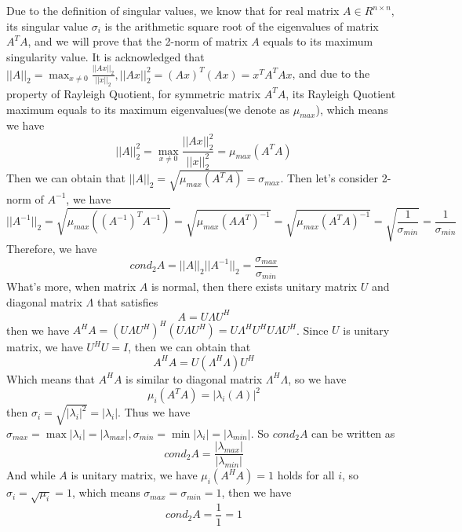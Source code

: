 \documentclass[a4paper]{article}
\begin{document}
Due to the definition of singular values, we know that for real matrix $A\in R^{n\times n}$, its singular value $\sigma_i$ is the arithmetic square root of 
the eigenvalues of matrix $A^TA$, and we will prove that the 2-norm of matrix $A$ equals to its maximum singularity value.
It is acknowledged that $||A||_2=\max_{x\neq 0}\frac{||Ax||_2}{||x||_2},||Ax||_2^2=(Ax)^T(Ax)=x^TA^TAx$, and due to the property of Rayleigh Quotient, for symmetric matrix $A^TA$, its Rayleigh Quotient maximum equals to its maximum eigenvalues(we denote as $\mu_{max}$), which means we have
\begin{equation}
  ||A||_2^2=\max_{x\neq 0}\frac{||Ax||_2^2}{||x||_2^2}=\mu_{max}(A^TA)
\end{equation}
Then we can obtain that $||A||_2=\sqrt{\mu_{max}(A^TA)}=\sigma_{max}$. Then let's consider 2-norm of $A^{-1}$, we have
\begin{equation}
  ||A^{-1}||_2=\sqrt{\mu_{max}((A^{-1})^TA^{-1})}=\sqrt{\mu_{max}(AA^T)^{-1}}=\sqrt{\mu_{max}(A^TA)^{-1}}=\sqrt{\frac{1}{\sigma_{min}}}=\frac{1}{\sigma_{min}}
\end{equation}
Therefore, we have
\begin{equation}
  cond_2A = ||A||_2||A^{-1}||_2=\frac{\sigma_{max}}{\sigma_{min}}
\end{equation}
What's more, when matrix $A$ is normal, then there exists unitary matrix $U$ and diagonal matrix $\Lambda$ that satisfies
\begin{equation}
  A= U \Lambda U^H
\end{equation}
then we have $A^HA=(U \Lambda U^H)^H(U \Lambda U^H)=U\Lambda^H U^H U \Lambda U^H$.
Since $U$ is unitary matrix, we have $U^HU=I$, then we can obtain that
\begin{equation}
  A^HA=U(\Lambda^H \Lambda)U^H
\end{equation}
Which means that $A^HA$ is similar to diagonal matrix $\Lambda^H\Lambda$, so we have
\begin{equation}
  \mu_i(A^TA)=|\lambda_i(A)|^2
\end{equation}
then $\sigma_i=\sqrt{|\lambda_i|^2}=|\lambda_i|$.
Thus we have $\sigma_{max}=\max|\lambda_i|=|\lambda_{max}|,\sigma_{min}=\min |\lambda_i|=|\lambda_{min}|$.
So $cond_2A$ can be written as
\begin{equation}
  cond_2A=\frac{|\lambda_{max}|}{|\lambda_{min}|}
\end{equation}
And while $A$ is unitary matrix, we have $\mu_i(A^HA)=1$ holds for all $i$, so $\sigma_i=\sqrt{\mu_i}=1$, which means
$\sigma_{max}=\sigma_{min}=1$, then we have 
\begin{equation}
  cond_2 A=\frac{1}{1}=1
\end{equation}
\end{document}
